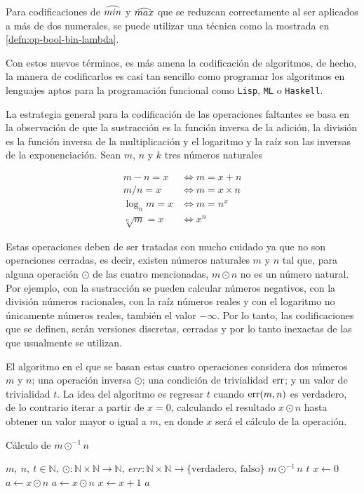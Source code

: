 Para codificaciones de \( \widehat{min} \) y \( \widehat{max} \) que se reduzcan correctamente al ser aplicados a más de dos numerales, se puede utilizar una técnica como la mostrada en \ref{defn:op-bool-bin-lambda}.

Con estos nuevos términos, es más amena la codificación de algoritmos, de hecho, la manera de codificarlos es casi tan sencillo como programar los algoritmos en lenguajes aptos para la programación funcional como \texttt{Lisp}, \texttt{ML} o \texttt{Haskell}.

La estrategia general para la codificación de las operaciones faltantes se basa en la observación de que la sustracción es la función inversa de la adición, la división es la función inversa de la multiplicación y el logaritmo y la raíz son las inversas de la exponenciación. Sean \( m \), \( n \) y \( k \) tres números naturales

\begin{align*}
  m-n = x &\iff m = x+n \\
  m/n = x &\iff m = x\times n\\
  \log_{n}m = x &\iff m = n^{x} \\
  \sqrt[n]m = x &\iff x^{n}
\end{align*}

Estas operaciones deben de ser tratadas con mucho cuidado ya que no son operaciones cerradas, es decir, existen números naturales \( m \) y \( n \) tal que, para alguna operación \( \odot \) de las cuatro mencionadas, \( m \odot n \) no es un número natural. Por ejemplo, con la sustracción se pueden calcular números negativos, con la división números racionales, con la raíz números reales y con el logaritmo no únicamente números reales, también el valor \( -\infty \). Por lo tanto, las codificaciones que se definen, serán versiones discretas, cerradas y por lo tanto inexactas de las que usualmente se utilizan.

El algoritmo en el que se basan estas cuatro operaciones considera dos números \( m \) y \( n \); una operación inversa \( \odot \); una condición de trivialidad \( {\rm err} \); y un valor de trivialidad \( t \). La idea del algoritmo es regresar \( t \) cuando \( {\rm err}(m,n) \) es verdadero, de lo contrario iterar a partir de \( x = 0 \), calculando el resultado \( x \odot n \) hasta obtener un valor mayor o igual a \( m \), en donde \( x \) será el cálculo de la operación.

\begin{algorithm}
  \caption{Cálculo de \( m \odot^{-1} n \)}
  \label{alg:inversas}
  \begin{algorithmic}
    \REQUIRE \( m,\ n,\ t \in \mathbb{N},\ \odot \colon \mathbb{N} \times \mathbb{N} \to \mathbb{N},\ err \colon \mathbb{N} \times \mathbb{N} \to \{ \mathrm{verdadero},\ \mathrm{falso} \} \)
    \ENSURE \( m \odot^{-1} n \)
    \RETURN \( t \)
    \ELSE
    \STATE \( x \leftarrow 0 \)
    \STATE \( a \leftarrow x \odot n \)
    \STATE \( a \leftarrow x \odot n \)
    \STATE \( x \leftarrow x + 1 \)
    \ENDWHILE
    \RETURN \( a \)
    \ENDIF
  \end{algorithmic}
\end{algorithm}


